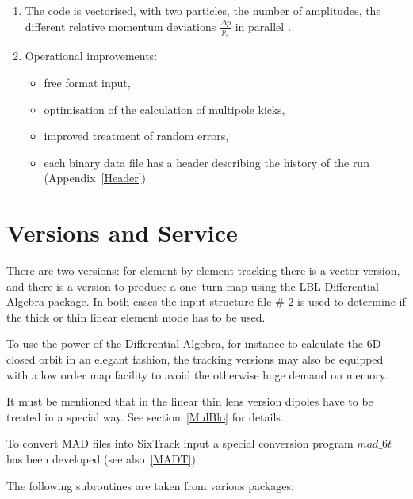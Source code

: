 \begin{enumerate}
    \item The code is vectorised, with two particles, the number of amplitudes, the different relative momentum deviations \mbox{$ \frac{\Delta p}{p_o} $} in parallel \cite{Sixvec}.
    \item Operational improvements:
    \begin{itemize}
        \item free format input,
        \item optimisation of the calculation of multipole kicks,
        \item improved treatment of random errors,
        \item each binary data file has a header describing the history of the run (Appendix~\ref{Header})
    \end{itemize}
\end{enumerate}

\section{Versions and Service}

There are two versions: for element by element tracking there is a vector version, and there is a version to produce a one--turn map using the LBL Differential Algebra package.
In both cases the input structure file \# 2 is used to determine if the thick or thin linear element mode has to be used.

To use the power of the Differential Algebra, for instance to calculate the 6D closed orbit in an elegant fashion, the tracking versions may also be equipped with a low order map facility to avoid the otherwise huge demand on memory.

It must be mentioned that in the linear thin lens version dipoles have to be treated in a special way.
See section~\ref{MulBlo} for details.

To convert MAD files into SixTrack input a special conversion program $mad\_6t$~\cite{CONVERTOR} has been developed (see also~\ref{MADT}).

The following subroutines are taken from various packages:

